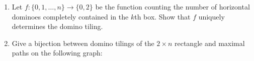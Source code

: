 \documentclass[11pt,fleqn]{book} %
\begin{document}
\begin{problem}
\begin{center}
        \end{center}
\begin{enumerate}[label=\alph*.]
    \item Let $f:\{0,1, \ldots ,n\}\to \{0,2\}$ be the function counting the number of horizontal dominoes completely contained in the $k$th box. Show that $f$ uniquely determines the domino tiling.
    \item Give a bijection between domino tilings of the $2\times n$ rectangle and maximal paths on the following graph:
        \begin{center}
\end{center}
\end{enumerate}
\end{problem}
\end{document}

